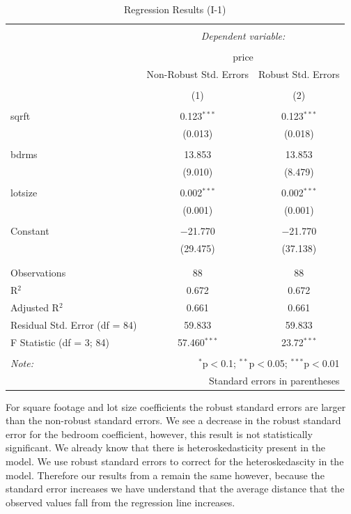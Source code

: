 \documentclass[
  12pt,
  landscape]{article}
\begin{document}
\begin{table}[H] \centering 
  \caption{Regression Results (I-1)} 
  \label{} 
\begin{tabular}{@{\extracolsep{5pt}}lcc} 
\\[-1.8ex]\hline 
\hline \\[-1.8ex] 
 & \multicolumn{2}{c}{\textit{Dependent variable:}} \\ 
\cline{2-3} 
\\[-1.8ex] & \multicolumn{2}{c}{price} \\ 
 & Non-Robust Std. Errors & Robust Std. Errors \\ 
\\[-1.8ex] & (1) & (2)\\ 
\hline \\[-1.8ex] 
 sqrft & 0.123$^{***}$ & 0.123$^{***}$ \\ 
  & (0.013) & (0.018) \\ 
  & & \\ 
 bdrms & 13.853 & 13.853 \\ 
  & (9.010) & (8.479) \\ 
  & & \\ 
 lotsize & 0.002$^{***}$ & 0.002$^{***}$ \\ 
  & (0.001) & (0.001) \\ 
  & & \\ 
 Constant & $-$21.770 & $-$21.770 \\ 
  & (29.475) & (37.138) \\ 
  & & \\ 
\hline \\[-1.8ex] 
Observations & 88 & 88 \\ 
R$^{2}$ & 0.672 & 0.672 \\ 
Adjusted R$^{2}$ & 0.661 & 0.661 \\ 
Residual Std. Error (df = 84) & 59.833 & 59.833 \\ 
F Statistic (df = 3; 84) & 57.460$^{***}$ & 23.72$^{***}$ \\ 
\hline 
\hline \\[-1.8ex] 
\textit{Note:}  & \multicolumn{2}{r}{$^{*}$p$<$0.1; $^{**}$p$<$0.05; $^{***}$p$<$0.01} \\ 
 & \multicolumn{2}{r}{Standard errors in parentheses} \\ 
\end{tabular} 
\end{table}

For square footage and lot size coefficients the robust standard errors
are larger than the non-robust standard errors. We see a decrease in the
robust standard error for the bedroom coefficient, however, this result
is not statistically significant. We already know that there is
heteroskedasticity present in the model. We use robust standard errors
to correct for the heteroskedascity in the model. Therefore our results
from a remain the same however, because the standard error increases we
have understand that the average distance that the observed values fall
from the regression line increases.
\end{document}
